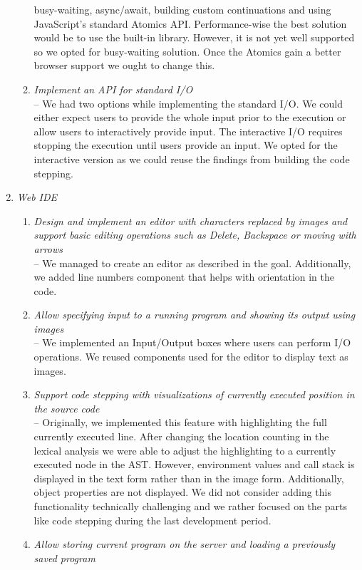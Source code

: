 \begin{enumerate}
\begin{enumerate}[label=(\alph*)]
     busy-waiting, async/await, building custom continuations and using JavaScript's standard Atomics API. Performance-wise the best solution would be to use the built-in
     library. However, it is not yet well supported so we opted for busy-waiting solution. Once the Atomics gain a better browser support we ought to change this.  
	 \item \textit{Implement an API for standard I/O} \\
     -- We had two options while implementing the standard I/O. We could either expect users to provide the whole input prior to the execution or allow users
     to interactively provide input. The interactive I/O requires stopping the execution until users provide an input. We opted for the interactive version as we
     could reuse the findings from building the code stepping.
   \end{enumerate}
\item \textit{Web IDE}
   \begin{enumerate}[label=(\alph*)]
     \item \textit{Design and implement an editor with characters replaced by images and support basic editing operations such as Delete,
     Backspace or moving with arrows} \\
     -- We managed to create an editor as described in the goal. Additionally, we added line numbers component that helps with orientation in the code.
	 \item \textit{Allow specifying input to a running program and showing its output using images} \\
     -- We implemented an Input/Output boxes where users can perform I/O operations. We reused components used for the editor to display text as
     images.
	 \item \textit{Support code stepping with visualizations of currently executed position in the source code} \\
     -- Originally, we implemented this feature with highlighting the full currently executed line. After changing the location counting in the
     lexical analysis we were able to adjust the highlighting to a currently executed node in the AST. However, environment values and call stack
     is displayed in the text form rather than in the image form. Additionally, object properties are not displayed. We did not consider adding this functionality
     technically challenging and we rather focused on the parts like code stepping during the last development period.
	 \item \textit{Allow storing current program on the server and loading a previously saved program} \\

\end{enumerate}
\end{enumerate}
